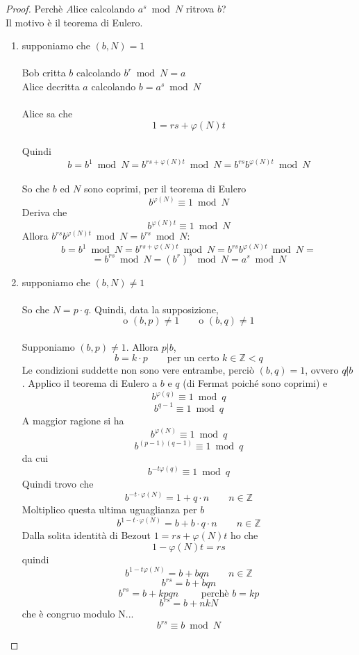\documentclass[a4paper,12pt, oneside]{book}
\begin{document}
\newpage
\begin{proof}
	Perchè $A\mbox{lice}$ calcolando $a^s \bmod N$ ritrova $b$?\\
	Il motivo è il teorema di Eulero.
	\begin{enumerate}
		\item supponiamo che $(b, N) = 1$\\\\
		      Bob critta $b$ calcolando $b^r \bmod N = a$\\
		      Alice decritta $a$ calcolando $b = a^s \bmod N$\\\\

		      Alice sa che $$1 = rs + \varphi(N)t$$\\
		      Quindi $$b = b^1 \bmod N = b^{rs + \varphi(N)t} \bmod N = b^{rs} b^{\varphi(N)t} \bmod N$$\\
		      So che $b$ ed $N$ sono coprimi, per il teorema di Eulero $$b^{\varphi(N)} \equiv 1 \bmod N$$
		      Deriva che $$b^{\varphi(N)t} \equiv 1 \bmod N$$
		      Allora $b^{rs} b^{\varphi(N)t} \bmod N= b^{rs} \bmod N$:
		      $$b = b^1 \bmod N = b^{rs + \varphi(N)t} \bmod N= b^{rs} b^{\varphi(N)t} \bmod N=$$ $$= b^{rs} \bmod N = (b^r)^s \bmod N = a^s \bmod N$$

		\item supponiamo che $(b, N) \not = 1$\\\\
		      So che $N = p \cdot q$. Quindi, data la supposizione,
		      $$\mbox{o } (b,p) \not=1 \qquad \mbox{o } (b,q) \not=1 $$\\
		      Supponiamo $(b,p) \not=1$. Allora $p|b$,
		      $$b = k \cdot p \qquad \mbox{per un certo } k \in \mathbb{Z} < q$$
		      Le condizioni suddette non sono vere entrambe, perciò $(b,q)=1$, ovvero $q \not| b$.
		      Applico il teorema di Eulero a $b$ e $q$ (di Fermat poiché sono coprimi) e
		      $$b^{\varphi(q)} \equiv 1 \bmod q$$
		      $$b^{q-1} \equiv 1 \bmod q$$
		      A maggior ragione si ha
		      $$b^{\varphi(N)} \equiv 1 \bmod q$$
		      $$b^{(p-1)(q-1)} \equiv 1 \bmod q$$
		      da cui
		      $$b^{-t\varphi(q)} \equiv 1 \bmod q$$
		      Quindi trovo che
		      $$b^{-t \cdot \varphi(N)} = 1 + q \cdot n \qquad n \in \mathbb{Z}$$
		      Moltiplico questa ultima uguaglianza per $b$
		      $$b^{1-t \cdot \varphi(N)} = b + b \cdot q \cdot n \qquad n \in \mathbb{Z}$$
		      Dalla solita identità di Bezout $1 = rs + \varphi(N)t$ ho che $$1-\varphi(N)t = rs$$ quindi
		      $$b^{1-t \varphi(N)} = b + b q n \qquad n \in \mathbb{Z}$$
		      $$b^{rs} = b + bqn$$
		      $$b^{rs} = b + kpqn \qquad \mbox{ perchè } b=kp$$
		      $$b^{rs} = b + nkN$$ che è congruo modulo N...
		      $$b^{rs} \equiv b \bmod N$$
	\end{enumerate}
\end{proof}
\end{document}
